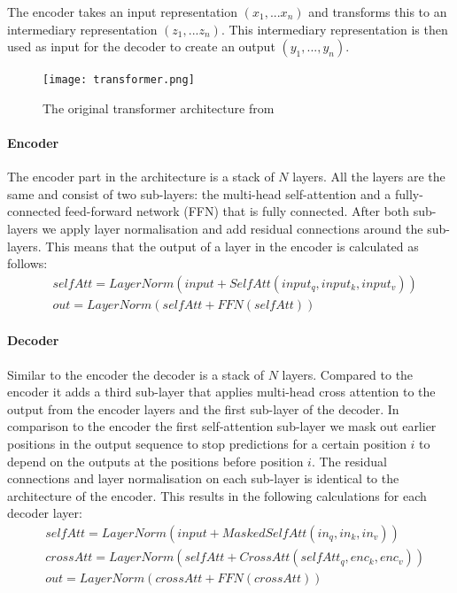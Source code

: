 The encoder takes an input representation $(x_1,...x_n)$ and transforms this to an intermediary representation $(z_1,...z_n)$. This intermediary representation is then used as input for the decoder to create an output $(y_1,...,y_n)$.

\begin{figure}[ht]
\centering
\texttt{[image: transformer.png]}
\caption{The original transformer architecture from \cite{vaswani_attention_2017}}
\label{fig:prelim:transformer-architecture}
\end{figure}

\paragraph{Encoder}
The encoder part in the architecture is a stack of $N$ layers. All the layers are the same and consist of two sub-layers: the multi-head self-attention and a fully-connected feed-forward network (FFN) that is fully connected. After both sub-layers we apply layer normalisation\cite{ba_layer_2016} and add residual connections\cite{he_deep_2015} around the sub-layers. This means that the output of a layer in the encoder is calculated as follows: 
\begin{align}
\label{par:prelim:transformer-encoder}
&selfAtt = LayerNorm(input + SelfAtt(input_q, input_k, input_v))\\
&out = LayerNorm(selfAtt + FFN(selfAtt))
\end{align}


\paragraph{Decoder}
Similar to the encoder the decoder is a stack of $N$ layers. Compared to the encoder it adds a third sub-layer that applies multi-head cross attention to the output from the encoder layers and the first sub-layer of the decoder. In comparison to the encoder the first self-attention sub-layer we mask out earlier positions in the output sequence to stop predictions for a certain position $i$ to depend on the outputs at the positions before position $i$. The residual connections and layer normalisation on each sub-layer is identical to the architecture of the encoder. This results in the following calculations for each decoder layer: 
\begin{align}
&selfAtt = LayerNorm(input + MaskedSelfAtt(in_q, in_k, in_v))\\
&crossAtt = LayerNorm(selfAtt + CrossAtt(selfAtt_q, enc_k, enc_v))\\
&out = LayerNorm(crossAtt + FFN(crossAtt))
\end{align}


